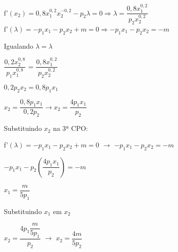 \begin{enumerate}
f'{$(x_{2}) = 0,8x_{1}^{0,2}x_{2}^{-0,2} - p_{2}\lambda = 0 \Longrightarrow \lambda = \dfrac{0,8x_{1}^{0,2}}{p_{2}x_{2}^{0,2}}$} \\

f'{$(\lambda) = -p_{1}x_{1} - p_{2}x_{2} + m = 0 \Longrightarrow -p_{1}x_{1} - p_{2}x_{2} = - m$}\\

\begin{center}
Igualando {$ \lambda = \lambda$}

\end{center}


\begin{center} 
{$\dfrac{0,2x_{2}^{0,8}}{p_{1}x_{1}^{0,8}}$} = {$\dfrac{0,8x_{1}^{0,2}}{p_{2}x_{2}^{0,2}}$}\\
\end{center}

\begin{center}
{$0,2p_{2}x_{2} = 0,8p_{1}x_{1}$}\\
\end{center}

\begin{center}
{$x_{2} = \dfrac{0,8p_{1}x_{1}}{0,2p_{2}} \rightarrow x_{2} = \dfrac{4p_{1}x_{1}}{p_{2}}$}
\end{center}

\begin{center}
Substituindo {$x_{2}$} na 3ª CPO:\\
\end{center}

\begin{center}
f'{$(\lambda) = -p_{1}x_{1} - p_{2}x_{2} + m = 0$} {$\rightarrow$} {$-p_{1}x_{1} - p_{2}x_{2} = - m$}\\
\end{center}

\begin{center}
{$ - p_{1}x_{1} - p_{2} \left(\dfrac{4p_{1}x_{1}}{p_{2}}\right) = -m$}\\
\end{center}

\begin{center}
{$x_{1} = \dfrac{m}{5p_{1}}$}\\
\end{center}

\begin{center}
Substituindo {$x_{1}$} em {$x_{2}$}\\
\end{center}

\begin{center}
{$x_{2} = \dfrac{4p_{1}{\dfrac{m}{5p_{1}}}}{p_{2}}$} {$\rightarrow$} {$x_{2} = \dfrac{4m}{5p_{2}}$}
\end{center}


\end{enumerate}
